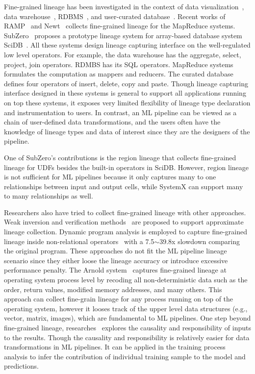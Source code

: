 \documentclass{sig-alternate}
\begin{document}
Fine-grained lineage has been investigated in the context of data visualization~\cite{stonebraker93, woodruff97},  
data warehouse~\cite{cui00, cui03}, RDBMS~\cite{widom04}, and user-curated database~\cite{buneman06}.
Recent works of RAMP~\cite{ikeda11, park11} and Newt~\cite{logothetis13} collects fine-grained lineage for the MapReduce
systems. SubZero~\cite{wu13} proposes a prototype lineage system for array-based database system SciDB~\cite{brown10}.
All these systems design lineage capturing interface on the well-regulated low level operators.
For example, the data warehouse has the aggregate, select, project, join operators. 
RDMBS has its SQL operators. MapReduce systems formulates the computation as mappers and reducers.
The curated database defines four operators of insert, delete, copy and paste.
Though lineage capturing interface designed in these systems is general to support all applications running on top these systems,
it exposes very limited flexibility of lineage type declaration and instrumentation to users.
In contrast, an ML pipeline can be viewed as a chain of user-defined data transformations, and the users often have the knowledge 
of lineage types and data of interest since they are the designers of the pipeline. 

One of SubZero's contributions is the region lineage that collects fine-grained lineage for UDFs besides the built-in operators in SciDB. 
However, region lineage is not sufficient for ML pipelines because it only captures many to one relationships between input and output cells, 
while SystemX can support many to many relationships as well.

Researchers also have tried to collect fine-grained lineage with other approaches.
Weak inversion and verification methods~\cite{woodruff97} are proposed to support approximate lineage collection.
Dynamic program analysis is employed to capture fine-grained lineage inside non-relational operators~\cite{zhang07} with 
a 7.5$\sim$39.8x slowdown comparing the original program. 
These approaches do not fit the ML pipeline lineage scenario since they either loose the lineage accuracy or introduce
excessive performance penalty.
The Arnold system~\cite{devecsery14} captures fine-grained lineage at operating system process level by recoding
all non-deterministic data such as the order, return values, modified memory addresses, and many others. 
This approach can collect fine-grain lineage for any process running on top of the operating system, however
it looses track of the upper level data structures (e.g., vector, matrix, images), which are fundamental to ML pipelines.
One step beyond fine-grained lineage, researches~\cite{meliou10, meliou11} explores the causality and responsibility
of inputs to the results. Though the causality and responsibility is relatively easier for data transformations in ML pipelines.
It can be applied in the training process analysis to infer the contribution of individual training sample to the model and predictions.
\end{document}
